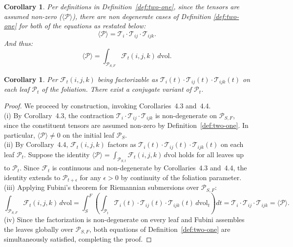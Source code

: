 \documentclass[10pt]{article}
\theoremstyle{plain}
\newtheorem{corollary}[theorem]{Corollary}
\theoremstyle{definition}
\theoremstyle{remark}
\begin{document}
\begin{corollary}
\label{cor:tensor-nz}
  Per definitions in Definition~\ref{def:two-one}, since the tensors are assumed non-zero ($\langle \mathcal{P} \rangle$), there are non degenerate cases of Definition \ref{def:two-one} for both of the equations as restated below:
  \begin{equation}
    \langle \mathcal{P} \rangle = \mathcal{T}_i \cdot \mathcal{T}_{ij} \cdot \mathcal{T}_{ijk}.
  \end{equation}
  And thus:
  \begin{equation}
    \langle \mathcal{P} \rangle = \int_{\mathcal{P}_{S,F}} \mathcal{F}_{t}(i, j, k) \, d\mathrm{vol}.
  \end{equation}
\end{corollary}

\begin{corollary}
\label{cor:three}
  Per $\mathcal{F}_t(i, j, k)$ being factorizable as $\mathcal{T}_i(t) \cdot \mathcal{T}_{ij}(t) \cdot \mathcal{T}_{ijk}(t)$ on each leaf $\mathcal{P}_t$ of the foliation. There exist a conjugate variant of $\mathcal{P}_t$.
\end{corollary}

\begin{proof}
\label{proof:construc}
We proceed by construction, invoking Corollaries~4.3 and~4.4.\\
(i) By Corollary~4.3, the contraction $\mathcal{T}_i \cdot \mathcal{T}_{ij} \cdot \mathcal{T}_{ijk}$ is non-degenerate on $\mathcal{P}_{S,F}$, since the constituent tensors are assumed non-zero by Definition~\ref{def:two-one}. In particular, $\langle \mathcal{P} \rangle \neq 0$ on the initial leaf $\mathcal{P}_S$.\\
(ii) By Corollary~4.4, $\mathcal{F}_t(i,j,k)$ factors as $\mathcal{T}_i(t) \cdot \mathcal{T}_{ij}(t) \cdot \mathcal{T}_{ijk}(t)$ on each leaf $\mathcal{P}_t$. Suppose the identity $\langle \mathcal{P} \rangle = \int_{\mathcal{P}_{S,t}} \mathcal{F}_t(i,j,k)\,d\mathrm{vol}$ holds for all leaves up to $\mathcal{P}_t$. Since $\mathcal{F}_t$ is continuous and non-degenerate by Corollaries~4.3 and~4.4, the identity extends to $\mathcal{P}_{t+\epsilon}$ for any $\epsilon > 0$ by continuity of the foliation parameter.\\
(iii) Applying Fubini's theorem for Riemannian submersions over $\mathcal{P}_{S,F}$:
\begin{equation}
  \int_{\mathcal{P}_{S,F}} \mathcal{F}_t(i,j,k)\,d\mathrm{vol}
  = \int_{S}^{F} \left(\int_{\mathcal{P}_t} \mathcal{T}_i(t) \cdot \mathcal{T}_{ij}(t) \cdot \mathcal{T}_{ijk}(t)\,d\mathrm{vol}_t\right) dt
  = \mathcal{T}_i \cdot \mathcal{T}_{ij} \cdot \mathcal{T}_{ijk}
  = \langle \mathcal{P} \rangle.
\end{equation}
(iv) Since the factorization is non-degenerate on every leaf and Fubini assembles the leaves globally over $\mathcal{P}_{S,F}$, both equations of Definition~\ref{def:two-one} are simultaneously satisfied, completing the proof.
\end{proof}
\end{document}
